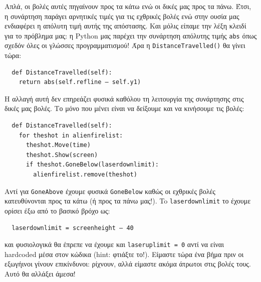 Απλά, οι βολές αυτές πηγαίνουν προς τα κάτω ενώ οι δικές μας προς τα πάνω. Έτσι, η συνάρτηση παράγει αρνητικές τιμές για τις εχθρικές βολές ενώ  στην ουσία μας ενδιαφέρει η απόλυτη τιμή αυτής της απόστασης. Και μόλις είπαμε την λέξη κλειδί για το πρόβλημα μας: η Python μας παρέχει την συνάρτηση απόλυτης τιμής {\tt abs} όπως σχεδόν όλες οι γλώσσες προγραμματισμού! Άρα η {\tt DistanceTravelled()} θα γίνει τώρα:

\begin{verbatim}
  def DistanceTravelled(self):
    return abs(self.refline – self.y1)
\end{verbatim}

Η αλλαγή αυτή δεν επηρεάζει φυσικά καθόλου τη λειτουργία της συνάρτησης στις δικές μας βολές.  Το μόνο που μένει είναι να δείξουμε και να κινήσουμε τις βολές:

\begin{verbatim}
  def DistanceTravelled(self):
    for theshot in alienfirelist:
      theshot.Move(time)
      theshot.Show(screen)
      if theshot.GoneBelow(laserdownlimit):
        alienfirelist.remove(theshot)
\end{verbatim}

Αντί για {\tt GoneAbove} έχουμε φυσικά {\tt GoneBelow} καθώς οι εχθρικές βολές κατευθύνονται προς τα κάτω (ή προς τα πάνω μας!). To {\tt laserdownlimit} το έχουμε ορίσει έξω από το βασικό βρόχο ως:

\begin{verbatim}
  laserdownlimit = screenheight – 40
\end{verbatim}

και φυσιολογικά θα έπρεπε να έχουμε και {\tt laseruplimit = 0} αντί να είναι hardcoded μέσα στον κώδικα (hint: φτιάξτε το!).  Είμαστε τώρα ένα βήμα πριν οι εξωγήινοι γίνουν επικίνδυνοι: ρίχνουν, αλλά είμαστε ακόμα άτρωτοι στις βολές τους.  Αυτό θα αλλάξει άμεσα!

